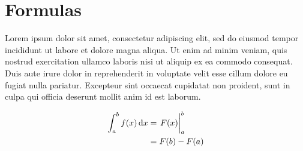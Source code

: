 \section{Formulas}

Lorem ipsum dolor sit amet, consectetur adipiscing elit, sed do eiusmod tempor
incididunt ut labore et dolore magna aliqua. Ut enim ad minim veniam, quis nostrud
exercitation ullamco laboris nisi ut aliquip ex ea commodo consequat. Duis aute
irure dolor in reprehenderit in voluptate velit esse cillum dolore eu fugiat nulla
pariatur. Excepteur sint occaecat cupidatat non proident, sunt in culpa qui officia
deserunt mollit anim id est laborum.

\begin{align}
    \int_a^b f(x) \diff x &= \evalat{F(x)}{a}{b} \\
                          &= F(b) - F(a)           
\end{align}